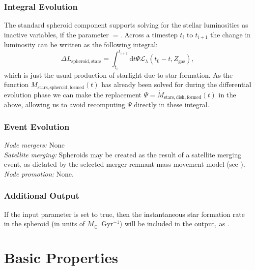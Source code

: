 \subsubsection{Integral Evolution}

The standard spheroid component supports solving for the stellar luminosities as inactive variables, if the parameter \mono{[spheroidLuminositiesStellarInactive]}$=$. Across a timestep $t_i$ to $t_{i+1}$ the change in luminosity can be written as the following integral:
\begin{equation}
\Delta L_\mathrm{spheroid, stars} = \int_{t_{i}}^{t_{i+1}} \mathrm{d}t \Psi \mathcal{L}_\lambda(t_0-t,Z_\mathrm{gas}),
\end{equation}
which is just the usual production of starlight due to star formation. As the function $M_\mathrm{stars, spheroid, formed}(t)$ has already been solved for during the differential evolution phase we can make the replacement $\Psi = \dot{M}_\mathrm{stars, disk, formed}(t)$ in the above, allowing us to avoid recomputing $\Psi$ directly in these integral.

\subsubsection{Event Evolution}

\noindent\emph{Node mergers:} None\\

\noindent\emph{Satellite merging:} Spheroids may be created as the result of a satellite merging event, as dictated by the selected merger remnant mass movement model (see ).\\

\noindent\emph{Node promotion:} None.\\

\subsubsection{Additional Output}

If the \mono{[spheroidOutputStarFormationRate]} input parameter is set to true, then the instantaneous star formation rate in the spheroid (in units of $M_\odot$~Gyr$^{-1}$) will be included in the output, as .

\section{Basic Properties}\label{sec:ComponentBasicProperties}

